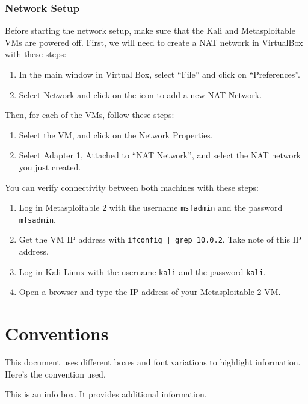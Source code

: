 \subsubsection*{Network Setup}

Before starting the network setup, make sure that the Kali and Metasploitable VMs are powered off. First, we will need to create a NAT network in VirtualBox with these steps: 

\begin{enumerate}
    \item In the main window in Virtual Box, select ``File'' and click on ``Preferences''.
    \item Select Network and click on the icon to add a new NAT Network.
\end{enumerate}

Then, for each of the VMs, follow these steps:

\begin{enumerate}
    \item Select the VM, and click on the Network Properties.
    \item Select Adapter 1, Attached to ``NAT Network'', and select the NAT network you just created.
\end{enumerate}

You can verify connectivity between both machines with these steps:

\begin{enumerate}
    \item Log in Metasploitable 2 with the username \texttt{msfadmin} and the password \texttt{mfsadmin}.
    \item Get the VM IP address with \texttt{ifconfig | grep 10.0.2}. Take note of this IP address.
    \item Log in Kali Linux with the username \texttt{kali} and the password \texttt{kali}.
    \item Open a browser and type the IP address of your Metasploitable 2 VM.
\end{enumerate}

\section*{Conventions}

This document uses different boxes and font variations to highlight information. Here's the convention used.

\begin{infobox}
    This is an info box. It provides additional information.
\end{infobox}


